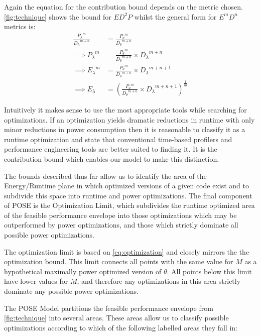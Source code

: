 Again the equation for the contribution bound depends on the metric chosen. 
\autoref{fig:technique} shows the bound for $ED^2P$ whilst the general form for $E^mD^n$ metrics is:
\begin{align}
\frac{{P_{\lambda}}^m}{{D_{\lambda}}^{m+n}} &= \frac{{P_{\theta}}^m}{{D_{\theta}}^{m+n}} \nonumber \\
\implies {P_{\lambda}}^m &= \frac{{P_{\theta}}^m}{{D_{\theta}}^{m+n}} \times {D_\lambda}^{m+n} \nonumber \\ 
\implies {E_{\lambda}}^m &= \frac{{P_{\theta}}^m}{{D_{\theta}}^{m+n}} \times {D_\lambda}^{m+n+1} \nonumber \\ 
\implies E_{\lambda} &= (\frac{{P_{\theta}}^m}{{D_{\theta}}^{m+n}} \times {D_\lambda}^{m+n+1})^{\frac{1}{m}} 
\end{align}

Intuitively it makes sense to use the most appropriate tools while searching for optimizations.  If an optimization yields dramatic reductions in runtime with only minor reductions in power consumption then it is reasonable to classify it as a runtime optimization and state that conventional time-based profilers and performance engineering tools are better suited to finding it. It is the contribution bound which enables our model to make this distinction.

The bounds described thus far allow us to identify the area of the Energy/Runtime plane in which optimized versions of a given code exist and to subdivide this space into runtime and power optimizations. The final component of POSE is the Optimization Limit, which subdivides the runtime optimized area of the feasible performance envelope into those optimizations which may be outperformed by power optimizations, and those which strictly dominate all possible power optimizations.

The optimization limit is based on \autoref{eq:optimization} and closely mirrors the the optimization bound.
This limit connects all points with the same value for $M$ as a hypothetical maximally power optimized version of $\theta$. 
All points below this limit have lower values for $M$, and therefore any optimizations in this area strictly dominate any possible power optimizations. 

The POSE Model partitions the feasible performance envelope from \autoref{fig:technique} into several areas.
These areas allow us to classify possible optimizations according to which of the following labelled areas they fall in:

